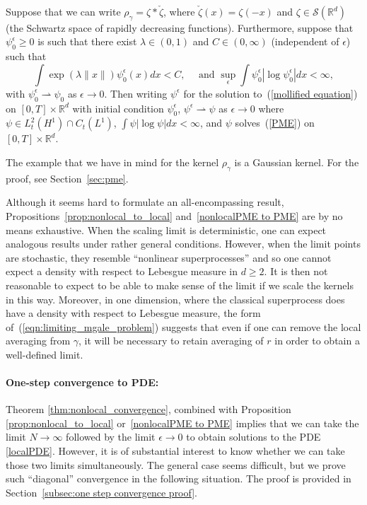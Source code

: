 \documentclass[EJP]{ejpecp} %
\newcommand{\IR}{\mathbb R}
\begin{document}
\begin{proposition}
	\label{nonlocalPME to PME}
Suppose that
we can write $\rho_\gamma=\zeta*\check{\zeta}$, where $\check{\zeta}(x)=\zeta(-x)$ and
$\zeta\in\mathcal{S}(\IR^d)$ (the Schwartz space of rapidly decreasing functions).
Furthermore, suppose that %
$\psi_0^\epsilon\geq 0$ is such that
there exist $\lambda\in (0,1)$ and $C\in (0,\infty)$ (independent
of $\epsilon$) such that 
\begin{equation*}
\int\exp(\lambda \|x\|)\psi_0^\epsilon(x)dx<C,\quad\mbox{ and }
\sup_\epsilon\int \psi_0^\epsilon|\log \psi_0^\epsilon|dx<\infty,
\end{equation*}
with
$\psi_0^\epsilon\rightharpoonup \psi_0$ as $\epsilon\to 0$. Then
writing $\psi^\epsilon$ for the solution to~(\ref{mollified equation})
on $[0,T]\times \IR^d$ with
initial condition $\psi_0^\epsilon$,
$\psi^\epsilon\rightharpoonup \psi$ as $\epsilon\to 0$ where
$\psi\in L_t^2(H^1)\cap C_t(L^1)$, $\int \psi|\log \psi| dx<\infty$, and
$\psi$ solves~(\ref{PME}) on $[0,T]\times \IR^d$. 
\end{proposition}

The example that we have in mind for the kernel $\rho_\gamma$ is a Gaussian kernel.
For the proof, see Section~\ref{sec:pme}.

\begin{remark} \label{remark_on_nonlocal_to_local}
Although it seems hard to formulate an all-encompassing result,
Propositions~\ref{prop:nonlocal_to_local} and~\ref{nonlocalPME to PME} are by no
means exhaustive. When the scaling limit is deterministic, one can 
expect analogous results under rather general conditions. However, when the limit
points are stochastic, they resemble ``nonlinear superprocesses'' and so one cannot
expect a density with respect to Lebesgue measure in $d\geq 2$. It is then not
reasonable to 
expect to be able to make sense of the limit if we scale the kernels in this way.
Moreover, in one dimension, where the classical superprocess does have a density with 
respect to Lebesgue measure, the form of~(\ref{eqn:limiting_mgale_problem})
suggests that even if one can remove the local averaging from $\gamma$, it
will be necessary
to retain averaging of $r$ in order to obtain a well-defined limit. 
\end{remark}


\paragraph{One-step convergence to PDE:}
Theorem \ref{thm:nonlocal_convergence},
combined with Proposition \ref{prop:nonlocal_to_local} or~\ref{nonlocalPME to PME}
implies that we can take the limit $N \to \infty$
followed by the limit $\epsilon \to 0$
to obtain solutions to the PDE \eqref{localPDE}.
However, it is of substantial interest to know whether
we can take those two limits simultaneously.
The general case seems difficult,
but we prove such ``diagonal'' convergence in the following situation.
The proof is provided in Section~\ref{subsec:one step convergence proof}.
\end{document}
